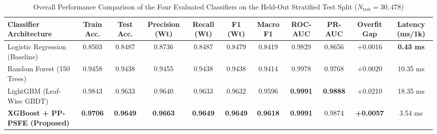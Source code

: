 \documentclass[conference]{IEEEtran}
\begin{document}
\begin{table}[t]
\centering
\caption{Overall Performance Comparison of the Four Evaluated Classifiers on the Held-Out Stratified Test Split ($N_{\text{test}} = 30,478$)}
\label{tab:overall}
\begin{tabular}{lcccccccccc}
\toprule
\textbf{Classifier Architecture} & \textbf{Train Acc.} & \textbf{Test Acc.} & \textbf{Precision (Wt)} & \textbf{Recall (Wt)} & \textbf{F1 (Wt)} & \textbf{Macro F1} & \textbf{ROC-AUC} & \textbf{PR-AUC} & \textbf{Overfit Gap} & \textbf{Latency (ms/1k)} \\
\midrule
Logistic Regression (Baseline) & 0.8503 & 0.8487 & 0.8736 & 0.8487 & 0.8479 & 0.8419 & 0.9829 & 0.8656 & +0.0016 & \textbf{0.43 ms} \\
Random Forest (150 Trees) & 0.9458 & 0.9438 & 0.9455 & 0.9438 & 0.9438 & 0.9414 & 0.9978 & 0.9768 & +0.0020 & 10.35 ms \\
LightGBM (Leaf-Wise GBDT) & 0.9843 & 0.9633 & 0.9640 & 0.9633 & 0.9632 & 0.9596 & \textbf{0.9991} & \textbf{0.9888} & +0.0210 & 18.35 ms \\
\textbf{XGBoost + PP-PSFE (Proposed)} & \textbf{0.9706} & \textbf{0.9649} & \textbf{0.9663} & \textbf{0.9649} & \textbf{0.9649} & \textbf{0.9618} & \textbf{0.9991} & 0.9874 & \textbf{+0.0057} & 3.54 ms \\
\bottomrule
\end{tabular}
\end{table}
\end{document}
